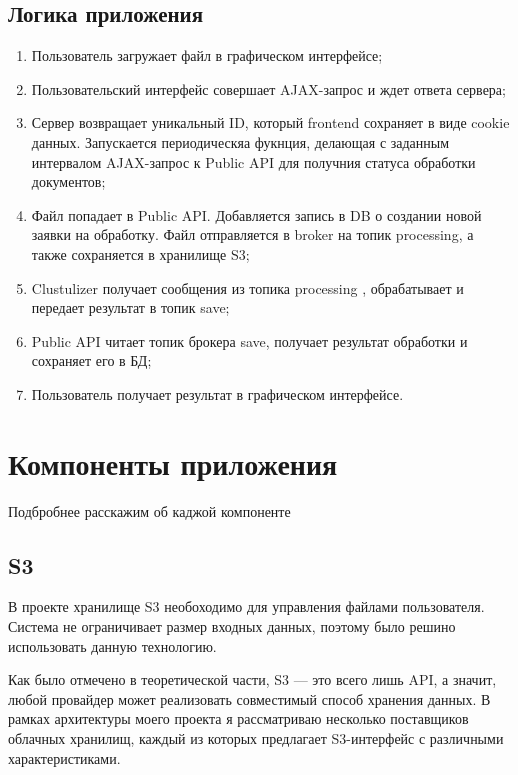\subsection{Логика приложения}
\begin{enumerate}[label=\arabic*)] 
\item Пользователь загружает файл в графическом интерфейсе;
\item Пользовательский интерфейс совершает AJAX-запрос и ждет ответа сервера;

\item Сервер возвращает уникальный ID, который frontend сохраняет в виде cookie данных. Запускается периодическяа фукнция, делающая с заданным интервалом AJAX-запрос к Public API для получния статуса обработки документов;

\item Файл попадает в Public API. Добавляется запись в  DB о создании новой заявки на обработку. Файл отправляется в broker на топик processing, а также сохраняется в хранилище S3;
\item Clustulizer получает сообщения из топика processing , обрабатывает  и передает результат в топик save;
\item Public API читает топик брокера save, получает результат обработки  и сохраняет его в БД;
\item Пользователь получает результат в графическом интерфейсе.
\end{enumerate}

\section{Компоненты приложения}
Подбробнее расскажим об каджой компоненте

\subsection{S3}

В проекте хранилище S3 необоходимо для управления файлами пользователя. Система не ограничивает размер входных данных, поэтому было решино использовать данную технологию.

Как было отмечено в теоретической части, S3 — это всего лишь API, а значит, любой провайдер может реализовать совместимый способ хранения данных. В рамках архитектуры моего проекта я рассматриваю несколько поставщиков облачных хранилищ, каждый из которых предлагает S3-интерфейс с различными характеристиками.

